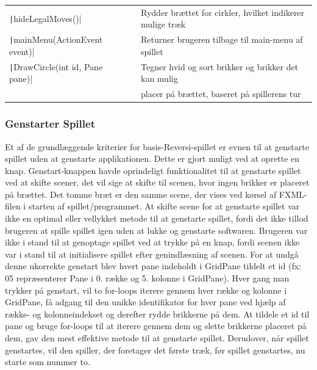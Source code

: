 \begin{table}[H]
\begin{tabular}{lll}
        \texttt|hideLegalMoves()|                     &                                    & Rydder brættet for cirkler, hvilket indikerer mulige træk \\
        \texttt|mainMenu(ActionEvent event)|          &                                    & Returner brugeren tilbage til main-menu af spillet        \\
        \texttt|DrawCircle(int id, Pane pane)|        &                                    & Tegner hvid og sort brikker og brikker det kan mulig      \\
                                                                &                                    & placer på brættet, baseret på spillerens tur              \\
        \bottomrule
    \end{tabular}
\end{table}
\subsubsection{Genstarter Spillet} \label{gs}
Et af de grundlæggende kriterier for basis-Reversi-spillet er evnen til at genstarte spillet uden at genstarte applikationen. Dette er gjort muligt ved at oprette en knap. Genstart-knappen havde oprindeligt funktionalitet til at genstarte spillet ved at skifte scener, det vil sige at skifte til scenen, hvor ingen brikker er placeret på brættet. Det tomme bræt er den samme scene, der vises ved kørsel af FXML-filen i starten af spillet/programmet. At skifte scene for at genstarte spillet var ikke en optimal eller vellykket metode til at genstarte spillet, fordi det ikke tillod brugeren at spille spillet igen uden at lukke og genstarte softwaren. Brugeren var ikke i stand til at genoptage spillet ved at trykke på en knap, fordi scenen ikke var i stand til at initialisere spillet efter genindlæsning af scenen.\newline
For at undgå denne ukorrekte genstart blev hvert pane indeholdt i GridPane tildelt et id (fx: 05 repræsenterer Pane i 0. række og 5. kolonne i GridPane). Hver gang man trykker på genstart, vil to for-loops iterere gennem hver række og kolonne i GridPane, få adgang til den unikke identifikator for hver pane ved hjælp af række- og kolonneindekset og derefter rydde brikkerne på dem. At tildele et id til pane og bruge for-loops til at iterere gennem dem og slette brikkerne placeret på dem, gav den mest effektive metode til at genstarte spillet. Derudover, når spillet genstartes, vil den spiller, der foretager det første træk, før spillet genstartes, nu starte som nummer to.